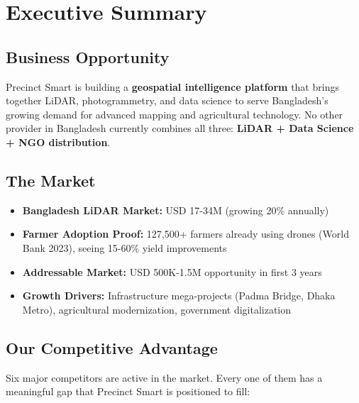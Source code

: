 
\chapter*{Executive Summary}

\section*{Business Opportunity}

Precinct Smart is building a \textbf{geospatial intelligence platform} that brings together LiDAR, photogrammetry, and data science to serve Bangladesh's growing demand for advanced mapping and agricultural technology. No other provider in Bangladesh currently combines all three: \textcolor{AccentGreen}{\textbf{LiDAR + Data Science + NGO distribution}}.

\section*{The Market}

\begin{itemize}
    \item \textbf{Bangladesh LiDAR Market:} USD 17-34M (growing 20\% annually)
    \item \textbf{Farmer Adoption Proof:} 127,500+ farmers already using drones (World Bank 2023), seeing 15-60\% yield improvements
    \item \textbf{Addressable Market:} USD 500K-1.5M opportunity in first 3 years
    \item \textbf{Growth Drivers:} Infrastructure mega-projects (Padma Bridge, Dhaka Metro), agricultural modernization, government digitalization
\end{itemize}

\section*{Our Competitive Advantage}

Six major competitors are active in the market. Every one of them has a meaningful gap that Precinct Smart is positioned to fill:

